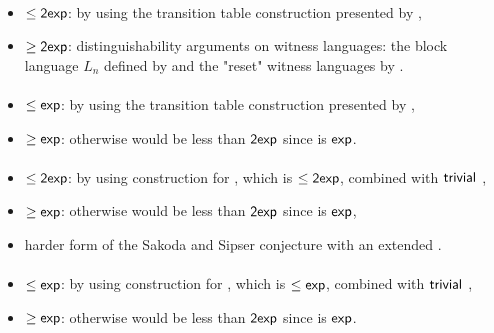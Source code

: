 \paragraph{\OLA{}\tto\ODFA}\label{cost:1LAto1DFA}
\begin{itemize}
	\item $\le\mathsf{2exp}$: by using the transition table construction presented by ,
	\item $\ge\mathsf{2exp}$: distinguishability arguments on witness languages: the block language $L_n$ defined by  and the "reset" witness languages by .
\end{itemize}
\paragraph{\OLA{}\tto\ONFA}\label{cost:1LAto1NFA}
\begin{itemize}
	\item $\le\mathsf{exp}$: by using the transition table construction presented by ,
	\item $\ge\mathsf{exp}$: otherwise \hyperref[cost:1LAto1DFA]{\OLA{}\tto\ODFA} would be less than $\mathsf{2exp}$ since \hyperref[cost:1NFAto1DFA]{\ONFA{}\tto\ODFA} is $\mathsf{exp}$.
\end{itemize}
\paragraph{\OLA{}\tto\TDFA}
\begin{itemize}
	\item $\le\mathsf{2exp}$: by using construction for \hyperref[cost:1LAto1DFA]{\OLA{}\tto\ODFA}, which is $\le\mathsf{2exp}$, combined with $\mathsf{trivial}$ \ODFA{}\tto\TDFA,
	\item $\ge\mathsf{exp}$: otherwise \hyperref[cost:1LAto1DFA]{\OLA{}\tto\ODFA} would be less than $\mathsf{2exp}$ since \hyperref[cost:2DFAto1DFA]{\TDFA{}\tto\ODFA} is $\mathsf{exp}$,
	\item harder form of the Sakoda and Sipser conjecture with an extended \TNFA.
\end{itemize}
\paragraph{\OLA{}\tto\TNFA}
\begin{itemize}
	\item $\le\mathsf{exp}$: by using construction for \hyperref[cost:1LAto1NFA]{\OLA{}\tto\ONFA}, which is $\le\mathsf{exp}$, combined with $\mathsf{trivial}$ \ONFA{}\tto\TNFA,
	\item $\ge\mathsf{exp}$: otherwise \hyperref[cost:1LAto1DFA]{\OLA{}\tto\ODFA} would be less than $\mathsf{2exp}$ since \TNFA{}\tto\ODFA is $\mathsf{exp}$.
\end{itemize}
